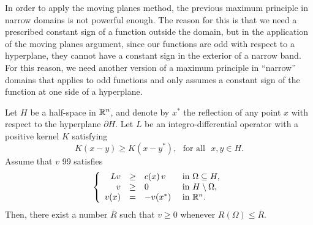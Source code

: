 
In order to apply the moving planes method, the previous maximum principle in narrow domains is not powerful enough. The reason for this is that we need a prescribed constant sign of a function outside the domain, but in the application of the moving planes argument, since our functions are odd with respect to a hyperplane, they cannot have a constant sign in the exterior of a narrow band. For this reason, we need another version of a maximum principle in ``narrow'' domains that applies to odd functions and only assumes a constant sign of the function at one side of a hyperplane.

\begin{proposition}
	\label{Prop:MaxPrpNarrowOdd}
	Let $H$ be a half-space in $\mathbb{R}^n$, and denote by $x^*$ the reflection of any point $x$ with respect to the hyperplane $\partial H$. Let $L$ be an integro-differential operator with a positive kernel $K$ satisfying
	\begin{equation}
	\label{Eq:KernelSymmetry}
	K(x-y) \geq K(x-y^*), \,\,\,\,\text{for all } \,\, x,y\in H.
	\end{equation}
	Assume that $v $ 99 satisfies 
	\begin{equation}
	\left\{\begin{array}{rcll}
	L v &\geq& c(x)\,v  &\textrm{ in } \Omega\subseteq H,\\
	v &\geq& 0 &\textrm{ in } H\setminus\Omega,\\
	v(x) &=& -v(x^*) &\textrm{ in } \mathbb{R}^n.
	\end{array} \right.
	\end{equation}
	Then, there exist a number $\overline{R}$ such that $v \geq 0$ whenever $R(\Omega) \leq \overline{R}$.
\end{proposition}

